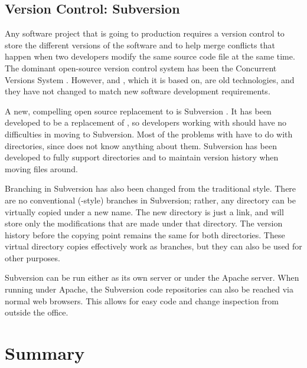\subsection{Version Control: Subversion}
\label{toc:oss:selected:svn}

Any software project that is going to production requires a version 
control to store the different versions of the software and to help 
merge conflicts that happen when two developers modify the same source 
code file at the same time. The dominant open-source version control 
system has been the Concurrent Versions System \cite{cvs}. However, 
 and , which it is based on, are old 
technologies, and they have not changed to match new software 
development requirements. \citep{versioncontrol} 

A new, compelling open source replacement to  is 
Subversion \citep{svn}. It has been developed to be a replacement of 
, so developers working with  should have no 
difficulties in moving to Subversion. Most of the problems with 
 have to do with directories, since  does not 
know anything about them. Subversion has been developed to fully 
support directories and to maintain version history when moving files 
around.

Branching in Subversion has also been changed from the traditional 
style. There are no conventional (-style) branches in 
Subversion; rather, any directory can be virtually copied under a new 
name. The new directory is just a link, and will store only the 
modifications that are made under that directory. The version history 
before the copying point remains the same for both directories. These 
virtual directory copies effectively work as branches, but they can 
also be used for other purposes.

Subversion can be run either as its own server or under the Apache 
 server. When running under Apache, the Subversion code 
repositories can also be reached via normal  web 
browsers. This allows for easy code and change inspection from outside 
the office.


\section{Summary}
\label{toc:oss:summary}


